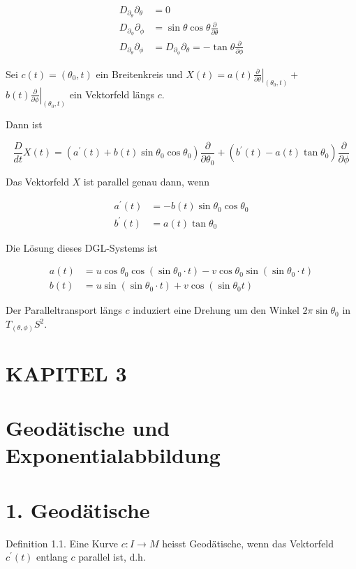 \documentclass[10pt]{article}
\begin{document}
$$
\begin{aligned}
D_{\partial_{\theta}} \partial_{\theta} & =0 \\
D_{\partial_{\phi}} \partial_{\phi} & =\sin \theta \cos \theta \frac{\partial}{\partial \theta} \\
D_{\partial_{\theta}} \partial_{\phi} & =D_{\partial_{\phi}} \partial_{\theta}=-\tan \theta \frac{\partial}{\partial \phi}
\end{aligned}
$$

Sei $c(t)=\left(\theta_{0}, t\right)$ ein Breitenkreis und $X(t)=\left.a(t) \frac{\partial}{\partial \theta}\right|_{\left(\theta_{0}, t\right)}+$ $\left.b(t) \frac{\partial}{\partial \phi}\right|_{\left(\theta_{0}, t\right)}$ ein Vektorfeld längs $c$.

Dann ist

$$
\frac{D}{d t} X(t)=\left(a^{\prime}(t)+b(t) \sin \theta_{0} \cos \theta_{0}\right) \frac{\partial}{\partial \theta_{0}}+\left(b^{\prime}(t)-a(t) \tan \theta_{0}\right) \frac{\partial}{\partial \phi}
$$

Das Vektorfeld $X$ ist parallel genau dann, wenn

$$
\begin{aligned}
a^{\prime}(t) & =-b(t) \sin \theta_{0} \cos \theta_{0} \\
b^{\prime}(t) & =a(t) \tan \theta_{0}
\end{aligned}
$$

Die Lösung dieses DGL-Systems ist

$$
\begin{aligned}
a(t) & =u \cos \theta_{0} \cos \left(\sin \theta_{0} \cdot t\right)-v \cos \theta_{0} \sin \left(\sin \theta_{0} \cdot t\right) \\
b(t) & =u \sin \left(\sin \theta_{0} \cdot t\right)+v \cos \left(\sin \theta_{0} t\right)
\end{aligned}
$$

Der Paralleltransport längs $c$ induziert eine Drehung um den Winkel $2 \pi \sin \theta_{0}$ in $T_{(\theta, \phi)} S^{2}$.

\section*{KAPITEL 3}
\section*{Geodätische und Exponentialabbildung}
\section*{1. Geodätische}
Definition 1.1. Eine Kurve $c: I \rightarrow M$ heisst Geodätische, wenn das Vektorfeld $c^{\prime}(t)$ entlang $c$ parallel ist, d.h.
\end{document}
